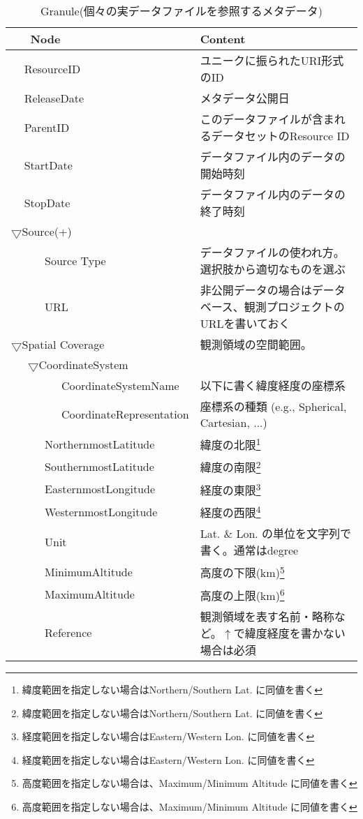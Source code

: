 \begin{table}[ht]
\begin{center}
{\scriptsize
\caption{Granule(個々の実データファイルを参照するメタデータ)}
\begin{tabular}{ll}\hline
\ \ \ Node & Content \\ \hline
\ \ \,ResourceID & ユニークに振られたURI形式のID\\
\ \ \,ReleaseDate & メタデータ公開日\\
\ \ \,ParentID & このデータファイルが含まれるデータセットのResource ID\\
\ \ \,StartDate & データファイル内のデータの開始時刻\\
\ \ \,StopDate & データファイル内のデータの終了時刻\\
$\bigtriangledown$Source(+) & \\
\ \ \ \ \ \ Source Type & データファイルの使われ方。選択肢から適切なものを選ぶ\\
\ \ \ \ \ \ URL & 非公開データの場合はデータベース、観測プロジェクトのURLを書いておく\\
$\bigtriangledown$Spatial Coverage & 観測領域の空間範囲。\\
\ \ \ $\bigtriangledown$CoordinateSystem &\\
\ \ \ \ \ \ \ \ \ CoordinateSystemName & 以下に書く緯度経度の座標系\\
\ \ \ \ \ \ \ \ \ CoordinateRepresentation & 座標系の種類 (e.g., Spherical, Cartesian, ...)\\
\ \ \ \ \ \ NorthernmostLatitude & 緯度の北限\footnote{緯度範囲を指定しない場合はNorthern/Southern Lat. に同値を書く}\\
\ \ \ \ \ \ SouthernmostLatitude & 緯度の南限\footnote{緯度範囲を指定しない場合はNorthern/Southern Lat. に同値を書く}\\
\ \ \ \ \ \ EasternmostLongitude & 経度の東限\footnote{経度範囲を指定しない場合はEastern/Western Lon. に同値を書く}\\
\ \ \ \ \ \ WesternmostLongitude & 経度の西限\footnote{経度範囲を指定しない場合はEastern/Western Lon. に同値を書く}\\
\ \ \ \ \ \ Unit & Lat. \& Lon. の単位を文字列で書く。通常はdegree\\
\ \ \ \ \ \ MinimumAltitude & 高度の下限(km)\footnote{高度範囲を指定しない場合は、Maximum/Minimum Altitude に同値を書く}\\
\ \ \ \ \ \ MaximumAltitude & 高度の上限(km)\footnote{高度範囲を指定しない場合は、Maximum/Minimum Altitude に同値を書く}\\
\ \ \ \ \ \ Reference & 観測領域を表す名前・略称など。$\uparrow$で緯度経度を書かない場合は必須\\ \hline
\end{tabular}
}
\end{center}
\end{table}
